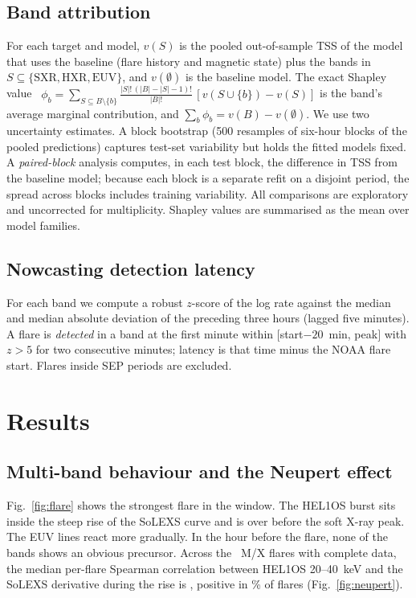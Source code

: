 \documentclass[conference]{IEEEtran}
\begin{document}
\subsection{Band attribution}
For each target and model, $v(S)$ is the pooled out-of-sample TSS of the model that uses the baseline (flare history and magnetic state) plus the bands in $S\subseteq\{\mathrm{SXR},\mathrm{HXR},\mathrm{EUV}\}$, and $v(\emptyset)$ is the baseline model. The exact Shapley value~\cite{shapley1953} $\phi_b=\sum_{S\subseteq B\setminus\{b\}}\frac{|S|!\,(|B|-|S|-1)!}{|B|!}\,[v(S\cup\{b\})-v(S)]$ is the band's average marginal contribution, and $\sum_b\phi_b=v(B)-v(\emptyset)$. We use two uncertainty estimates. A block bootstrap (500 resamples of six-hour blocks of the pooled predictions) captures test-set variability but holds the fitted models fixed. A \emph{paired-block} analysis computes, in each test block, the difference in TSS from the baseline model; because each block is a separate refit on a disjoint period, the spread across blocks includes training variability. All comparisons are exploratory and uncorrected for multiplicity. Shapley values are summarised as the mean over model families.

\subsection{Nowcasting detection latency}
For each band we compute a robust $z$-score of the log rate against the median and median absolute deviation of the preceding three hours (lagged five minutes). A flare is \emph{detected} in a band at the first minute within $[$start$-20$~min, peak$]$ with $z>5$ for two consecutive minutes; latency is that time minus the NOAA flare start. Flares inside SEP periods are excluded.

\section{Results}
\subsection{Multi-band behaviour and the Neupert effect}
Fig.~\ref{fig:flare} shows the strongest flare in the window. The HEL1OS burst sits inside the steep rise of the SoLEXS curve and is over before the soft X-ray peak. The EUV lines react more gradually. In the hour before the flare, none of the bands shows an obvious precursor. Across the \NeuN\ M/X flares with complete data, the median per-flare Spearman correlation between HEL1OS 20--40~keV and the SoLEXS derivative during the rise is \NeuMedian, positive in \NeuPos\% of flares (Fig.~\ref{fig:neupert}).
\end{document}
